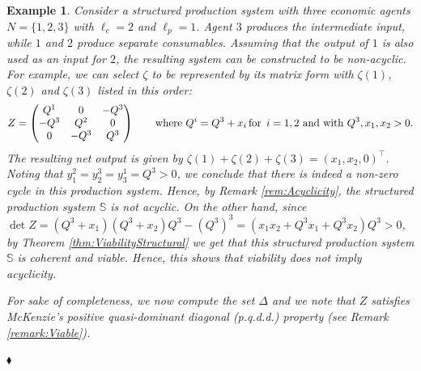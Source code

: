 \documentclass[11pt,fleqn]{article}
\newtheorem{expl}[theorem]{Example}
\newenvironment{example}{\begin{expl} \rm}{\hfill $\blacklozenge$
\end{expl}}
\begin{document}
\begin{example}\label{ex: viable not acyclic}
	Consider a structured production system with three economic agents $N=\{1,2,3\}$ with $\ell_c =2$ and $\ell_p=1$. Agent $3$ produces the intermediate input, while $1$ and $2$ produce separate consumables. Assuming that the output of $1$ is also used as an input for $2$, the resulting system can be constructed to be non-acyclic. \\
	For example, we can select $\zeta$ to be represented by its matrix form with $\zeta (1)$, $\zeta (2)$ and $\zeta (3)$ listed in this order:
	\[
	Z =
	\begin{pmatrix}
	Q^1 & 0 & -Q^3 \\
	-Q^3 & Q^2 & 0 \\
	0 & -Q^3 & Q^3
	\end{pmatrix}
	\qquad \mbox{where } Q^i=Q^3+x_i\, \mbox{for \,} i=1,2 \,\,\mbox{and with } Q^3,x_1,x_2>0.
	\]
	The resulting net output is given by $\zeta (1) + \zeta (2) + \zeta ( 3) =(x_1,x_2,0)^\top$.
	\\
	Noting that $ y^2_1= y^3_2 = y^1_3 =Q^3>0$, we conclude that there is indeed a non-zero cycle in this production system. Hence, by Remark \ref{rem:Acyclicity}, the  structured production system  $\mathbb S$ is not  acyclic. On the other hand, since $\det Z =(Q^3+x_1)(Q^3+x_2)Q^3 - (Q^3)^3 = (x_1x_2 + Q^3x_1 + Q^3x_2)Q^3 >0$, by Theorem \ref{thm:ViabilityStructural} we get that this structured production system $\mathbb S$  is coherent and   viable.  Hence, this shows that viability does not imply acyclicity. 
	
	\noindent For sake of completeness, we now compute the set $\Delta$ and we note that $Z$ satisfies McKenzie's positive quasi-dominant diagonal (p.q.d.d.) property (see Remark \ref{remark:Viable}).
	

\end{example}
\end{document}

